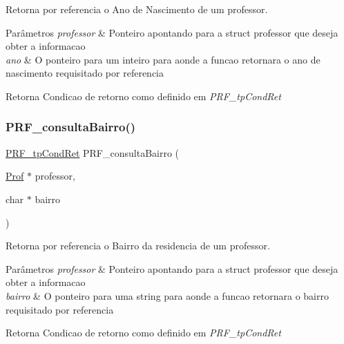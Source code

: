Retorna por referencia o Ano de Nascimento de um professor. 


\begin{DoxyParams}{Parâmetros}
{\em professor} & Ponteiro apontando para a struct professor que deseja obter a informacao \\
\hline
{\em ano} & O ponteiro para um inteiro para aonde a funcao retornara o ano de nascimento requisitado por referencia \\
\hline
\end{DoxyParams}
\begin{DoxyReturn}{Retorna}
Condicao de retorno como definido em {\itshape P\+R\+F\+\_\+tp\+Cond\+Ret} 
\end{DoxyReturn}
\mbox{\label{group__funcoes_consulta_gab2fb73bef414349be7908fc2cd1eef92}} 
\subsubsection{\texorpdfstring{P\+R\+F\+\_\+consulta\+Bairro()}{PRF\_consultaBairro()}}
{\footnotesize\ttfamily \hyperlink{group__modulo_professor_ga777e215896d573d2e99d98793b1f0ed1}{P\+R\+F\+\_\+tp\+Cond\+Ret} P\+R\+F\+\_\+consulta\+Bairro (\begin{DoxyParamCaption}\item[{\hyperlink{structprof}{Prof} $\ast$}]{professor,  }\item[{char $\ast$}]{bairro }\end{DoxyParamCaption})}



Retorna por referencia o Bairro da residencia de um professor. 


\begin{DoxyParams}{Parâmetros}
{\em professor} & Ponteiro apontando para a struct professor que deseja obter a informacao \\
\hline
{\em bairro} & O ponteiro para uma string para aonde a funcao retornara o bairro requisitado por referencia \\
\hline
\end{DoxyParams}
\begin{DoxyReturn}{Retorna}
Condicao de retorno como definido em {\itshape P\+R\+F\+\_\+tp\+Cond\+Ret} 
\end{DoxyReturn}
\mbox{\label{group__funcoes_consulta_ga2de6ca98fdf2c21b329dec040d49429f}} 
